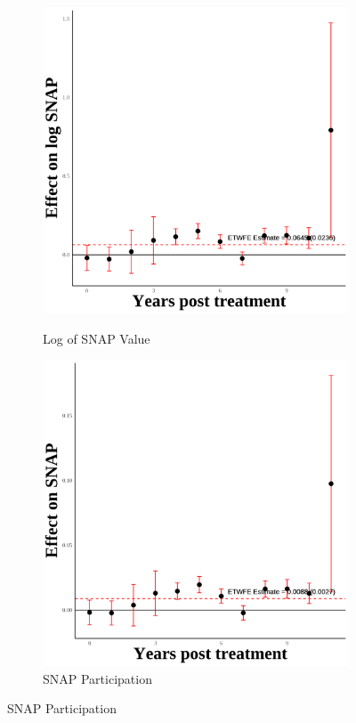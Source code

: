 \documentclass[12pt,english]{article}
\begin{document}
\begin{figure}[H]
  \begin{subfigure}[b]{0.3\textwidth}
    \centering
    \caption{Log of SNAP Value}
    \includegraphics[width=\linewidth]{figures/plot52-ln_snap_event_study-third.png}
    \label{fig:ln-snap-third}
  \end{subfigure}
  \hfill
  \begin{subfigure}[b]{0.3\textwidth}
    \centering
    \caption{SNAP Participation}
    \includegraphics[width=\linewidth]{figures/plot53-snap_event_study-third.png}

\end{subfigure}
\end{figure}
\end{document}

